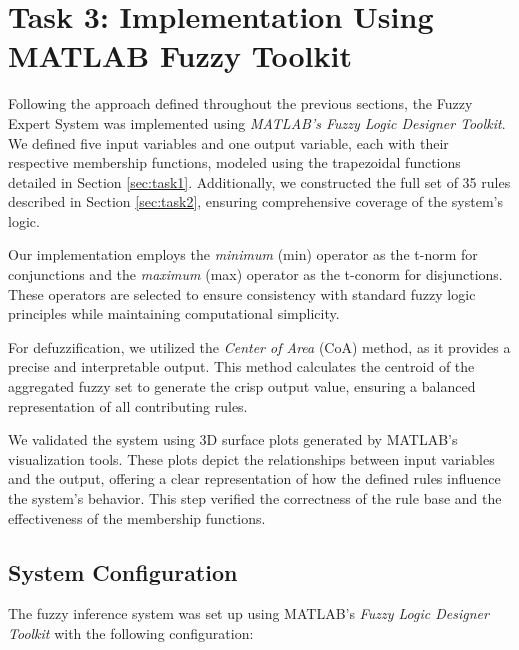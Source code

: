 \documentclass{article}
\begin{document}
\section{Task 3: Implementation Using MATLAB Fuzzy Toolkit}


Following the approach defined throughout the previous sections, the Fuzzy Expert System was implemented using \textit{MATLAB's Fuzzy Logic Designer Toolkit}. We defined five input variables and one output variable, each with their respective membership functions, modeled using the trapezoidal functions detailed in Section \ref{sec:task1}. Additionally, we constructed the full set of 35 rules described in Section \ref{sec:task2}, ensuring comprehensive coverage of the system’s logic.

Our implementation employs the \textit{minimum} (min) operator as the t-norm for conjunctions and the \textit{maximum} (max) operator as the t-conorm for disjunctions. These operators are selected to ensure consistency with standard fuzzy logic principles while maintaining computational simplicity.

For defuzzification, we utilized the \textit{Center of Area} (CoA) method, as it provides a precise and interpretable output. This method calculates the centroid of the aggregated fuzzy set to generate the crisp output value, ensuring a balanced representation of all contributing rules.

We validated the system using 3D surface plots generated by MATLAB's visualization tools. These plots depict the relationships between input variables and the output, offering a clear representation of how the defined rules influence the system's behavior. This step verified the correctness of the rule base and the effectiveness of the membership functions.

\subsection{System Configuration}


The fuzzy inference system was set up using MATLAB's \textit{Fuzzy Logic Designer Toolkit} with the following configuration:
\end{document}
